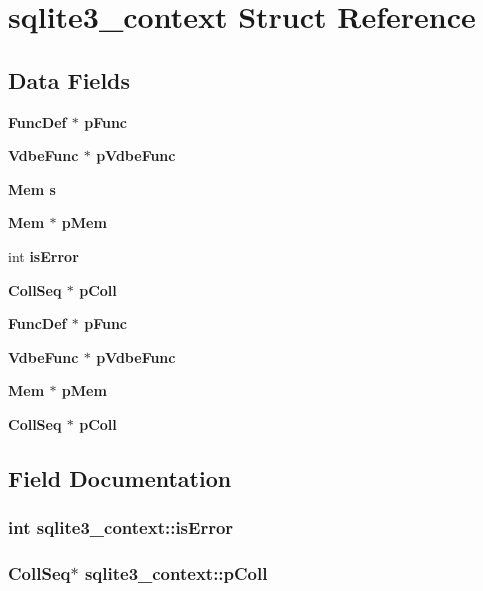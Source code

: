 \section{sqlite3\_\-context Struct Reference}
\label{structsqlite3__context}
\subsection*{Data Fields}
\begin{CompactItemize}
\item 
\bf{Func\-Def} $\ast$ \bf{p\-Func}
\item 
\bf{Vdbe\-Func} $\ast$ \bf{p\-Vdbe\-Func}
\item 
\bf{Mem} \bf{s}
\item 
\bf{Mem} $\ast$ \bf{p\-Mem}
\item 
int \bf{is\-Error}
\item 
\bf{Coll\-Seq} $\ast$ \bf{p\-Coll}
\item 
\bf{Func\-Def} $\ast$ \bf{p\-Func}
\item 
\bf{Vdbe\-Func} $\ast$ \bf{p\-Vdbe\-Func}
\item 
\bf{Mem} $\ast$ \bf{p\-Mem}
\item 
\bf{Coll\-Seq} $\ast$ \bf{p\-Coll}
\end{CompactItemize}


\subsection{Field Documentation}
\subsubsection{\setlength{\rightskip}{0pt plus 5cm}int \bf{sqlite3\_\-context::is\-Error}}\label{structsqlite3__context_0fd119930124d5f7b2a6c5a46f61c620}


\subsubsection{\setlength{\rightskip}{0pt plus 5cm}\bf{Coll\-Seq}$\ast$ \bf{sqlite3\_\-context::p\-Coll}}\label{structsqlite3__context_6678f97481b4f2ca552963b8c5a7dee5}


